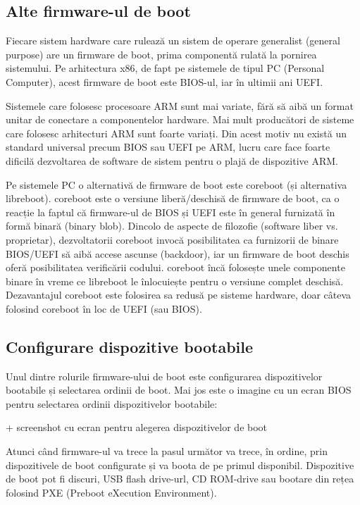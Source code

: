 \subsection{Alte firmware-ul de boot}
\label{sec:boot-firmware-uefi}

Fiecare sistem hardware care rulează un sistem de operare generalist (general
purpose) are un firmware de boot, prima componentă rulată la pornirea
sistemului. Pe arhitectura x86, de fapt pe sistemele de tipul PC (Personal
Computer), acest firmware de boot este BIOS-ul, iar în ultimii ani UEFI.

Sistemele care folosesc procesoare ARM sunt mai variate, fără să aibă un format
unitar de conectare a componentelor hardware. Mai mult producători de sisteme
care folosesc arhitecturi ARM sunt foarte variați. Din acest motiv nu există un
standard universal precum BIOS sau UEFI pe ARM, lucru care face foarte dificilă
dezvoltarea de software de sistem pentru o plajă de dispozitive ARM.

Pe sistemele PC o alternativă de firmware de boot este coreboot (și alternativa
libreboot). coreboot este o versiune liberă/deschisă de firmware de boot, ca o
reacție la faptul că firmware-ul de BIOS și UEFI este în general furnizată în
formă binară (binary blob). Dincolo de aspecte de filozofie (software liber vs.
proprietar), dezvoltatorii coreboot invocă posibilitatea ca furnizorii de binare
BIOS/UEFI să aibă accese ascunse (backdoor), iar un firmware de boot deschis
oferă posibilitatea verificării codului. coreboot încă folosește unele
componente binare în vreme ce libreboot le înlocuiește pentru o versiune complet
deschisă. Dezavantajul coreboot este folosirea sa redusă pe sisteme hardware,
doar câteva folosind coreboot în loc de UEFI (sau BIOS).

\subsection{Configurare dispozitive bootabile}
\label{sec:boot-firmware-devices}

Unul dintre rolurile firmware-ului de boot este configurarea dispozitivelor
bootabile și selectarea ordinii de boot. Mai jos este o imagine cu un ecran BIOS
pentru selectarea ordinii dispozitivelor bootabile:

+     screenshot cu ecran pentru alegerea dispozitivelor de boot

Atunci când firmware-ul va trece la pasul următor va trece, în ordine, prin
dispozitivele de boot configurate și va boota de pe primul disponibil.
Dispozitive de boot pot fi discuri, USB flash drive-url, CD ROM-drive sau
bootare din rețea folosind PXE 
(Preboot eXecution Environment).

